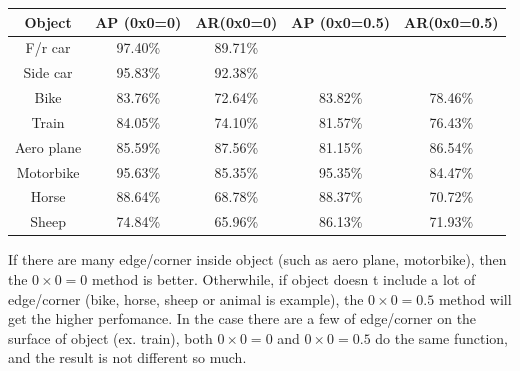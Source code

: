 \begin{table}[htbp]
\small
\begin{tabular}{|c||c|c||c|c|}%
    \hline 
     Object &  AP (0x0=0) & AR(0x0=0) & AP (0x0=0.5)  & AR(0x0=0.5)  \\ \hline 
     F/r car & 97.40\% & 89.71\% & & \\ \hline
     Side car & 95.83\% & 92.38\% & & \\ \hline
	 Bike & 83.76\% & 72.64\% & 83.82\% & 78.46\% \\ \hline
	Train & 84.05\% & 74.10\% & 81.57\% & 76.43\% \\ \hline
	Aero plane & 85.59\% & 87.56\% & 81.15\% & 86.54\% \\ \hline
	Motorbike & 95.63\% & 85.35\% & 95.35\% & 84.47\% \\ \hline
	Horse & 88.64\% & 68.78\% & 88.37\% & 70.72\% \\ \hline
	Sheep & 74.84\% & 65.96\% & 86.13\% & 71.93\% \\ \hline 
\end{tabular}
\label{table:compare_0_5}
\end{table}
If there are many edge/corner inside object (such as aero plane,
motorbike), then the $0\times 0=0$ method is better. Otherwhile, if object
doesn t include a lot of edge/corner (bike, horse, sheep or animal is
example), the $0\times 0=0.5$ method will get the higher perfomance. In the
case there are a few of edge/corner on the surface of object (ex.
train), both $0\times 0=0$ and $0\times 0=0.5$ do the same function, and the result
is not different so much.
